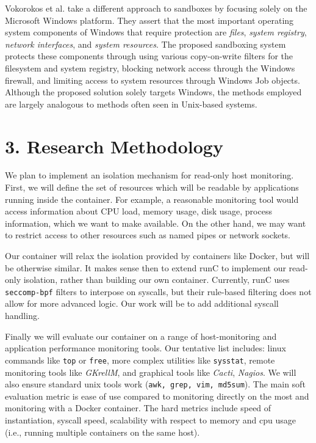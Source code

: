 \documentclass{proc}
\begin{document}
Vokorokos et al. \cite{vokorokos2015sandboxMSWIN} take a different approach to sandboxes by focusing solely on the Microsoft Windows platform. They assert that the most important operating system components of Windows that require protection are \textit{files}, \textit{system registry}, \textit{network interfaces}, and \textit{system resources}. The proposed sandboxing system protects these components through using various copy-on-write filters for the filesystem and system registry, blocking network access through the Windows firewall, and limiting access to system resources through Windows Job objects. Although the proposed solution solely targets Windows, the methods employed are largely analogous to methods often seen in Unix-based systems.

\section*{3. Research Methodology}
We plan to implement an isolation mechanism for read-only host monitoring. First, we will define the set of resources which will be readable by applications running inside the container. For example, a reasonable monitoring tool would access information about CPU load, memory usage, disk usage, process information, which we want to make available. On the other hand, we may want to restrict access to other resources such as named pipes or network sockets.

Our container will relax the isolation provided by containers like Docker, but will be otherwise similar. It makes sense then to extend runC to implement our read-only isolation, rather than building our own container. Currently, runC uses \texttt{seccomp-bpf} filters to interpose on syscalls, but their rule-based filtering does not allow for more advanced logic. Our work will be to add additional syscall handling.

Finally we will evaluate our container on a range of host-monitoring and application performance monitoring tools. Our tentative list includes: linux commands like \texttt{top} or \texttt{free}, more complex utilities like \texttt{sysstat}, remote monitoring tools like \emph{GKrellM}, and graphical tools like \emph{Cacti}, \emph{Nagios}. We will also ensure standard unix tools work (\texttt{awk, grep, vim, md5sum}). The main soft evaluation metric is ease of use compared to monitoring directly on the most and monitoring with a Docker container. The hard metrics include speed of instantiation, syscall speed, scalability with respect to memory and cpu usage (i.e., running multiple containers on the same host). 
\end{document}
